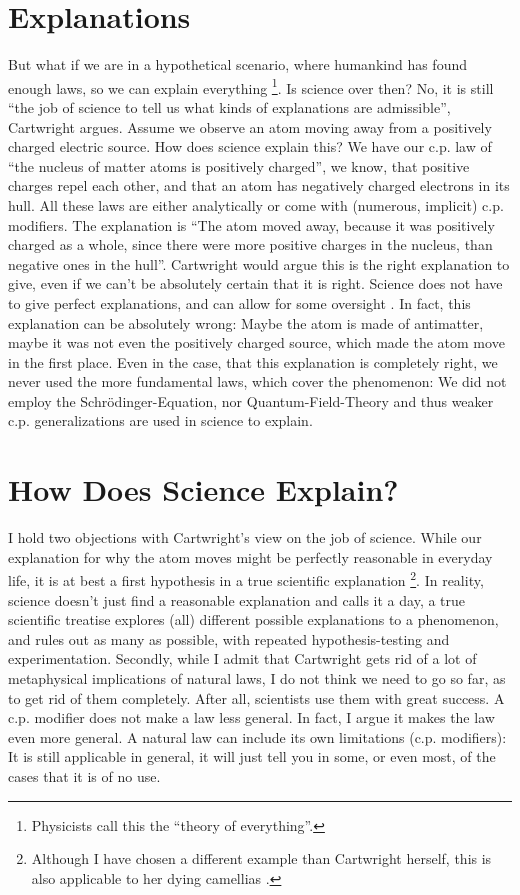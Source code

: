 \section*{Explanations}
But what if we are in a hypothetical scenario, where humankind has
found enough laws, so we can explain everything
\footnote{Physicists call this the \enquote{theory of everything}.}.
Is science over then?
No, it is still
\enquote{the job of science to tell us what kinds of explanations are admissible}\cite[7]{cartwright1980truth},
Cartwright argues.
Assume we observe an atom moving away from a positively charged electric source.
How does science explain this?
We have our c.p. law of \enquote{the nucleus of matter atoms is positively charged},
we know, that positive charges
repel each other, and that an atom has negatively charged electrons in its hull.
All these laws are either analytically or come with (numerous, implicit) c.p. modifiers.
The explanation is
\enquote{The atom moved away, because it was positively charged as a whole, since there
    were more positive charges in the nucleus, than negative ones in the hull}.
Cartwright would argue this is the right explanation to give, even if we
can't be absolutely certain that it is right.
Science does not have to give perfect explanations, and can allow for some oversight
\cite[7,8]{cartwright1980truth}.
In fact, this explanation can be absolutely wrong: Maybe the atom is made of antimatter,
maybe it was not even the positively charged source, which made the atom move in the first place.
Even in the case, that this explanation is completely right, we never
used the more fundamental laws, which cover the phenomenon:
We did not employ the Schrödinger-Equation, nor Quantum-Field-Theory
and thus weaker c.p. generalizations are used in science to explain.


\section*{How Does Science Explain?}
I hold two objections with Cartwright's view on
the job of science.
While our explanation for why the atom moves might be
perfectly reasonable in everyday life, it is at best
a first hypothesis in a true scientific explanation
\footnote{Although I have chosen a different example than Cartwright herself,
    this is also applicable to her dying camellias \cite[6]{cartwright1980truth}.}.
In reality, science doesn't just find a reasonable explanation and calls it a day,
a true scientific treatise explores (all) different
possible explanations to a phenomenon, and rules
out as many as possible, with repeated hypothesis-testing
and experimentation.
Secondly, while I admit that Cartwright gets rid of a lot of metaphysical implications
of natural laws, I do not think we need to go so far, as to get rid of them
completely. After all, scientists use them with great success.
A c.p. modifier does not make a law less general. In fact, I argue
it makes the law even more general. A natural law can include its own
limitations (c.p. modifiers): It is still applicable in general, it will
just tell you in some, or even most, of the cases that it is of no use.

